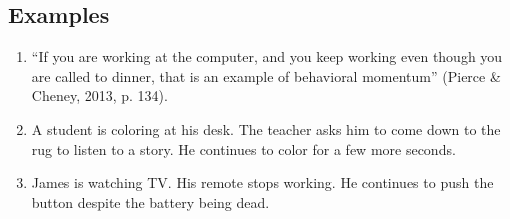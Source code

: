 \subsection{Examples}
\begin{enumerate}
\item ``If you are working at the computer, and you keep working even though you are called to dinner, that is an example of behavioral momentum'' (Pierce \& Cheney, 2013, p. 134).
\item A student is coloring at his desk. The teacher asks him to come down to the rug to listen to a story. He continues to color for a few more seconds.
\item James is watching TV. His remote stops working. He continues to push the button despite the battery being dead.
%
\end{enumerate}
%

